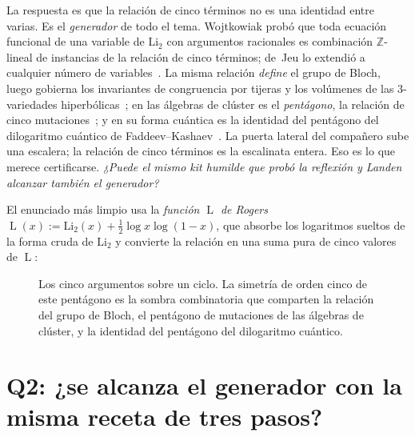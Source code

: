 \documentclass[11pt]{article}
\newcommand{\Li}{\mathrm{Li}_2}
\DeclareMathOperator{\Lrog}{L}
\newcommand{\keyeq}[1]{\begin{center}\keybox{$\displaystyle #1$}\end{center}}
\begin{document}
La respuesta es que la relaci\'on de cinco t\'erminos no es una identidad entre varias. Es el
\emph{generador} de todo el tema. Wojtkowiak prob\'o que toda ecuaci\'on funcional de una
variable de $\Li$ con argumentos racionales es combinaci\'on $\mathbb{Z}$-lineal de
instancias de la relaci\'on de cinco t\'erminos; de~Jeu lo extendi\'o a cualquier n\'umero de
variables~\cite{wojtkowiak,dejeu}. La misma relaci\'on \emph{define} el grupo de Bloch, luego
gobierna los invariantes de congruencia por tijeras y los vol\'umenes de las $3$-variedades
hiperb\'olicas~\cite{bloch,suslin,neumannzagier}; en las \'algebras de cl\'uster es el
\emph{pent\'agono}, la relaci\'on de cinco mutaciones~\cite{nakanishi}; y en su forma
cu\'antica es la identidad del pent\'agono del dilogaritmo cu\'antico de
Faddeev--Kashaev~\cite{faddeevkashaev}. La puerta lateral del compa\~nero sube una escalera;
la relaci\'on de cinco t\'erminos es la escalinata entera. Eso es lo que merece certificarse.
\emph{¿Puede el mismo kit humilde que prob\'o la reflexi\'on y Landen alcanzar tambi\'en el
generador?}

El enunciado m\'as limpio usa la \emph{funci\'on $\Lrog$ de Rogers}
$\Lrog(x):=\Li(x)+\tfrac12\log x\log(1-x)$, que absorbe los logaritmos sueltos de la forma
cruda de $\Li$ y convierte la relaci\'on en una suma pura de cinco valores de $\Lrog$:
\keyeq{\Lrog(x)+\Lrog(y)=\Lrog(xy)+\Lrog\!\Big(\tfrac{x(1-y)}{1-xy}\Big)
  +\Lrog\!\Big(\tfrac{y(1-x)}{1-xy}\Big),\qquad x,y\in(0,1).}

\begin{figure}[t]
\centering
{}
\caption{\label{fig:pentagon}Los cinco argumentos sobre un ciclo. La simetr\'ia de orden
cinco de este pent\'agono es la sombra combinatoria que comparten la relaci\'on del grupo de
Bloch, el pent\'agono de mutaciones de las \'algebras de cl\'uster, y la identidad del
pent\'agono del dilogaritmo cu\'antico.}
\end{figure}

\section{Q2: ¿se alcanza el generador con la misma receta de tres pasos?}\label{sec:proof}
\end{document}
